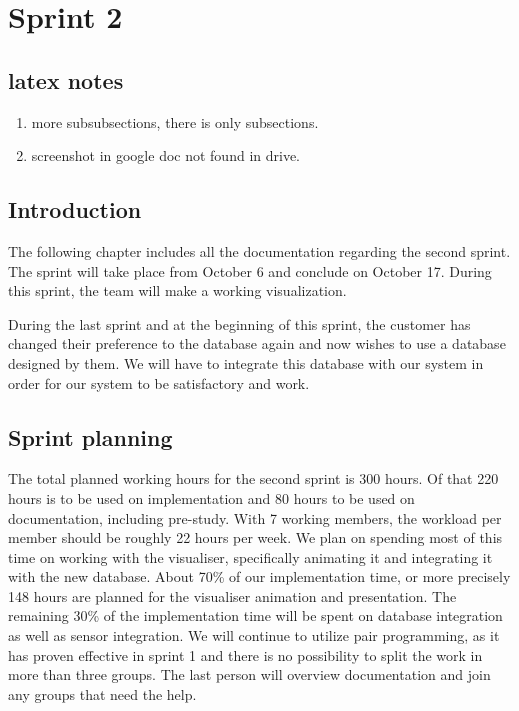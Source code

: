 \documentclass[../document]{subfiles}
\begin{document}
\section{Sprint 2}
\subsection{latex notes}
\begin{enumerate}
\item
more subsubsections, there is only subsections.
\item
screenshot in google doc not found in drive.
\end{enumerate}
\subsection{Introduction}
The following chapter includes all the documentation regarding the second sprint. The sprint will take place from October 6 and conclude on October 17. During this sprint, the team will make a working visualization.

During the last sprint and at the beginning of this sprint, the customer has changed their preference to the database again and now wishes to use a database designed by them. We will have to integrate this database with our system in order for our system to be satisfactory and work.

\subsection{Sprint planning}
The total planned working hours for the second sprint is 300 hours. Of that 220 hours is to be used on implementation and 80 hours to be used on documentation, including pre-study. With 7 working members, the workload per member should be roughly 22 hours per week. We plan on spending most of this time on working with the visualiser, specifically animating it and integrating it with the new database. About 70\% of our implementation time, or more precisely 148 hours are planned for the visualiser animation and presentation. The remaining 30\% of the implementation time will be spent on database integration as well as sensor integration. We will continue to utilize pair programming, as it has proven effective in sprint 1 and there is no possibility to split the work in more than three groups. The last person will overview documentation and join any groups that need the help. 
\end{document}
